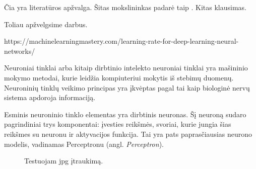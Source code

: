 Čia yra literatūros apžvalga. Šitas mokslininkas padarė taip \cite{horvath2016}.
%
Kitas klausimas.

Toliau apžvelgsime \cite{ezhov1969} darbus.

https://machinelearningmastery.com/learning-rate-for-deep-learning-neural-networks/

Neuroniai tinklai arba kitaip dirbtinio intelekto neuroniai tinklai yra mašininio mokymo metodai, kurie leidžia kompiuteriui mokytis iš stebimų duomenų. Neuroninių tinklų veikimo principas yra įkvėptas pagal tai kaip biologinė nervų sistema apdoroja informaciją.\cite{Sukhadeve2017}


Esminis neuroninio tinklo elementas yra dirbtinis neuronas. Šį neuroną sudaro pagrindiniai trys komponentai: įvesties reikšmės, svoriai, kurie jungia šias reikšmes su neuronu ir aktyvacijos funkcija. Tai yra pats paprasčiausias neurono modelis, vadinamas Perceptronu (angl. \textit{Perceptron}).\cite{Andrew2017}

\begin{figure}
  \centering
{}
\caption{Testuojam jpg įtraukimą.}
\end{figure}

